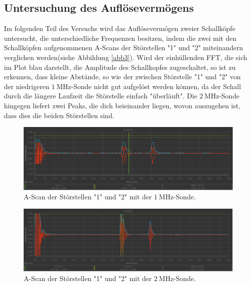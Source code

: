 \subsection{Untersuchung des Auflösevermögens}
Im folgenden Teil des Versuchs wird das Auflösevermögen zweier Schallköpfe untersucht, die unterschiedliche
Frequenzen besitzen, indem die zwei mit den Schallköpfen aufgenommenen A-Scans der Störstellen "1" und "2" miteinandern verglichen werden(siehe Abbildung \ref{abb3}).
Wird der einhüllenden FFT, die sich im Plot blau darstellt, die Amplitude des Schallkopfes zugeschaltet, so ist zu erkennen, dass kleine
Abstände, so wie der zwischen Störstelle "1" und "2" von der niedrigeren $\SI{1}{\mega \hertz}$-Sonde nicht gut aufgelöst werden können,
da der Schall durch die längere Laufzeit die Störstelle einfach "überläuft". Die $\SI{2}{\mega \hertz}$-Sonde hingegen liefert zwei Peaks,
die dich beieinander liegen, wovon auszugehen ist, dass dies die beiden Störstellen sind.
\FloatBarrier
\begin{figure}
    \centering
  \includegraphics[scale=0.6]{1.2.1MHz.Frequenz.PNG}
  \caption{A-Scan der Störstellen "1" und "2" mit der $\SI{1}{\mega \hertz}$-Sonde.}
  \label{abb6}
\end{figure}
\FloatBarrier

\begin{figure}
  \centering
 \includegraphics[scale=0.6]{1.2.2MHz.Frequenz.PNG}
 \caption{A-Scan der Störstellen "1" und "2" mit der $\SI{2}{\mega \hertz}$-Sonde.}
 \label{abb7}
\end{figure}
\FloatBarrier

